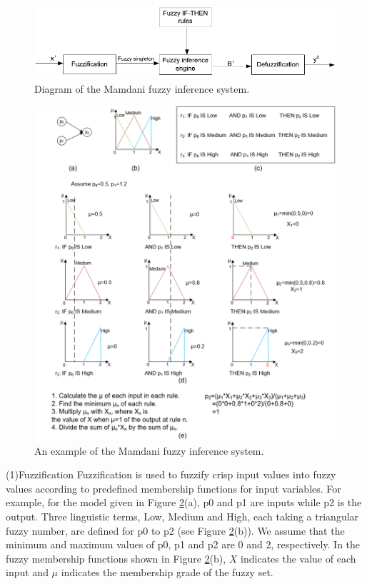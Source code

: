 \documentclass[journal,a4paper,onecolumn]{article}
\begin{document}
\begin{figure}[!hbt]
	\begin{center}
		\includegraphics[width=\columnwidth]{fig48}
		\caption{Diagram of the Mamdani fuzzy inference system.}
		\label{fig:diagram-Mamdani}
	\end{center}
\end{figure}

\begin{figure}[!hbt]
	\begin{center}
		\includegraphics[width=\columnwidth]{fuzzy_logic_example}
		\caption{An example of the Mamdani fuzzy inference system.}
		\label{fig:example -Mamdani}
	\end{center}
\end{figure}

(1)Fuzzification
Fuzzification is used to fuzzify crisp input values into fuzzy values according to predefined membership functions for input variables. 
For example, for the model given in Figure \ref{fig:example -Mamdani}(a), p0 and p1 are inputs while p2 is the output. Three linguistic terms, Low, Medium and High, each taking a triangular fuzzy number, are defined for p0 to p2 (see Figure \ref{fig:example -Mamdani}(b)). We assume that the minimum and maximum values of p0, p1 and p2 are 0 and 2, respectively. In the fuzzy membership functions shown in Figure \ref{fig:example -Mamdani}(b), $X$ indicates the value of each input and $\mu$ indicates the membership grade of the fuzzy set.
\end{document}
